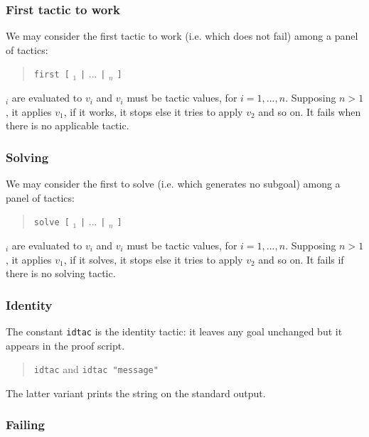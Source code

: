 \subsubsection{First tactic to work}

We may consider the first tactic to work (i.e. which does not fail) among a
panel of tactics:
\begin{quote}
{\tt first [} {\tacexpr}$_1$ {\tt |} $...$ {\tt |} {\tacexpr}$_n$ {\tt ]}
\end{quote}
{\tacexpr}$_i$ are evaluated to $v_i$ and $v_i$ must be tactic values, for 
$i=1,...,n$. Supposing $n>1$, it applies $v_1$, if it works, it stops else it
tries to apply $v_2$ and so on. It fails when there is no applicable tactic.

\ErrMsg {}

\subsubsection{Solving}

We may consider the first to solve (i.e. which generates no subgoal) among a
panel of tactics:
\begin{quote}
{\tt solve [} {\tacexpr}$_1$ {\tt |} $...$ {\tt |} {\tacexpr}$_n$ {\tt ]}
\end{quote}
{\tacexpr}$_i$ are evaluated to $v_i$ and $v_i$ must be tactic values, for 
$i=1,...,n$. Supposing $n>1$, it applies $v_1$, if it solves, it stops else it
tries to apply $v_2$ and so on. It fails if there is no solving tactic.

\ErrMsg {}

\subsubsection{Identity}

The constant {\tt idtac} is the identity tactic: it leaves any goal
unchanged but it appears in the proof script.
\begin{quote}
{\tt idtac} and {\tt idtac "message"}
\end{quote}
The latter variant prints the string on the standard output.


\subsubsection{Failing}

